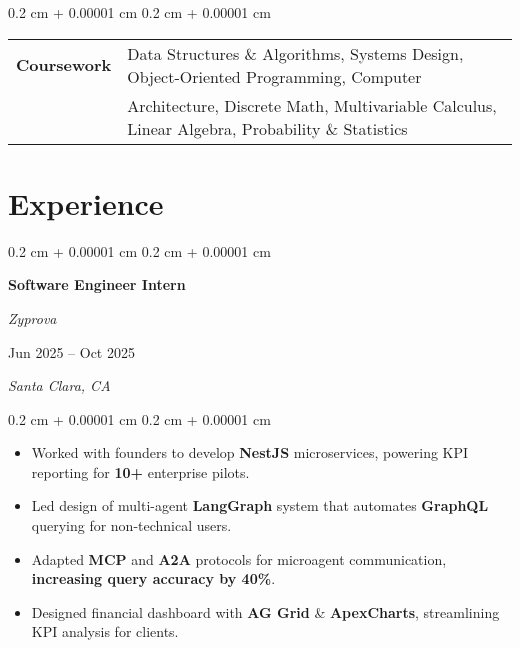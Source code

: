 \documentclass[10pt, letterpaper]{article}
\newenvironment{highlights}{
    \begin{itemize}[
        topsep=0.10 cm,
        parsep=0.10 cm,
        partopsep=0pt,
        itemsep=0pt,
        leftmargin=0.4 cm + 10pt
    ]
}{
    \end{itemize}
} %
\newenvironment{onecolentry}{
    \begin{adjustwidth}{
        0.2 cm + 0.00001 cm
    }{
        0.2 cm + 0.00001 cm
    }
}{
    \end{adjustwidth}
} %
\newenvironment{twocolentry}[2][]{
    \onecolentry
    \def\secondColumn{#2}
    \setcolumnwidth{\fill, 5 cm}
    \begin{paracol}{2}
}{
    \switchcolumn \raggedleft \secondColumn
    \end{paracol}
    \endonecolentry
} %
\let\hrefWithoutArrow\href
\renewcommand{\href}[2]{\hrefWithoutArrow{#1}{\ifthenelse{\equal{#2}{}}{ }{#2 }\raisebox{.15ex}{\footnotesize \faExternalLink*}}}
\begin{document}
        \vspace{0.2 cm}
        \begin{onecolentry}
            \begin{tabularx}{\textwidth}{@{}p{2.15cm}Y@{}}
                \textbf{Coursework} & Data Structures \& Algorithms, Systems Design, Object-Oriented Programming, Computer \\ & Architecture, Discrete Math, Multivariable Calculus, Linear Algebra, Probability \& Statistics \\
            \end{tabularx}
        \end{onecolentry}



    
    \section{Experience}



        
        \begin{twocolentry}{
        Jun 2025 – Oct 2025 
            
        \textit{Santa Clara, CA}}
            \textbf{Software Engineer Intern}
            
            \textit{Zyprova}
        \end{twocolentry}

        \vspace{0.10 cm}
        \begin{onecolentry}
            \begin{highlights}
                \item Worked with founders to develop \textbf{NestJS} microservices, powering KPI reporting for \textbf{10+} enterprise pilots.
                \item Led design of multi-agent \textbf{LangGraph} system that automates \textbf{GraphQL} querying for non-technical users.
                \item Adapted \textbf{MCP} and \textbf{A2A} protocols for microagent communication, \textbf{increasing query accuracy by 40\%}.
                \item Designed financial dashboard with \textbf{AG Grid} \& \textbf{ApexCharts}, streamlining KPI analysis for clients.
            \end{highlights}
        \end{onecolentry}
\end{document}
